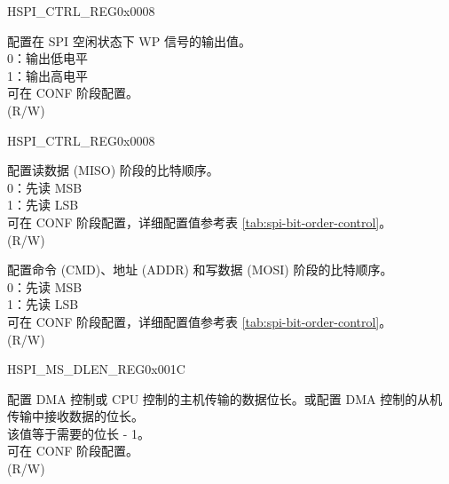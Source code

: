 \begin{register}{H}{SPI\_CTRL\_REG}{0x0008}
\begin{regdesc}
\begin{reglist}
\label{fielddesc:SPIWPPOL}\item [SPI\_WP\_POL] 配置在 SPI 空闲状态下 WP 信号的输出值。\\
0：输出低电平 \\
1：输出高电平 \\
可在 CONF 阶段配置。\\
(R/W)

\item [见下页]
\end{reglist}\end{regdesc}
\end{register}

\addtocounter{Regfloat}{-1}
\begin{register}{H}{SPI\_CTRL\_REG}{0x0008}
\begin{regdesc}\begin{reglist}
\item [接上页]

\label{fielddesc:SPIRDBITORDER}\item [SPI\_RD\_BIT\_ORDER] 配置读数据 (MISO) 阶段的比特顺序。\\
0：先读 MSB \\
1：先读 LSB \\
可在 CONF 阶段配置，详细配置值参考表 \ref{tab:spi-bit-order-control}。\\
(R/W)
\label{fielddesc:SPIWRBITORDER}\item [SPI\_WR\_BIT\_ORDER] 配置命令 (CMD)、地址 (ADDR) 和写数据 (MOSI) 阶段的比特顺序。\\
0：先读 MSB \\
1：先读 LSB \\
可在 CONF 阶段配置，详细配置值参考表 \ref{tab:spi-bit-order-control}。\\
(R/W)
\end{reglist}\end{regdesc}
\end{register}


\begin{register}{H}{SPI\_MS\_DLEN\_REG}{0x001C}\label{regdesc:SPIMSDLENREG}
%
%
\regnewline%
\begin{regdesc}\begin{reglist}
\label{fielddesc:SPIMSDATABITLEN}\item [SPI\_MS\_DATA\_BITLEN] 配置 DMA 控制或 CPU 控制的主机传输的数据位长。或配置 DMA 控制的从机传输中接收数据的位长。\\
该值等于需要的位长 - 1。 \\
可在 CONF 阶段配置。\\
(R/W)
\end{reglist}\end{regdesc}
\end{register}


